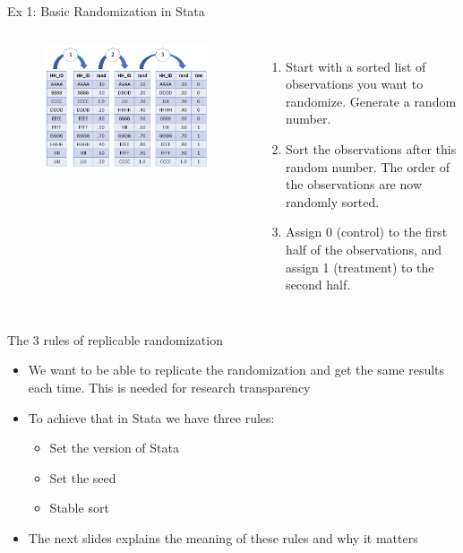 \documentclass[aspectratio=169]{beamer}
\begin{document}
\begin{frame}[fragile]{Ex 1: Basic Randomization in Stata}
	\begin{columns}[c]
		\begin{figure}
			\centering
			\includegraphics[width=\linewidth]{img/randomeg1}
		\end{figure}

		\begin{enumerate}
			\item \small Start with a sorted list of observations you want to randomize. Generate a random number.
			\item \small Sort the observations after this random number. The order of the observations are now randomly sorted.
			\item \small Assign 0 (control) to the first half of the observations, and assign 1 (treatment) to the second half.
		\end{enumerate}
	\end{columns}
\end{frame}


\begin{frame}{The 3 rules of replicable randomization}
	\begin{itemize}
		\item We want to be able to replicate the randomization and get the same results each time. This is needed for research transparency
		\item To achieve that in Stata we have three rules:
		\begin{itemize}
			\item Set the version of Stata
			\item Set the seed
			\item Stable sort
		\end{itemize}
		\item The next slides explains the meaning of these rules and why it matters
	\end{itemize}
\end{frame}
\end{document}
